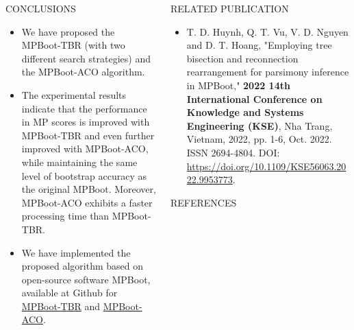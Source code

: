 \documentclass[%
  final,%
  english,%
]{beamer}
\begin{document}
\begin{frame}[t, fragile = singleslide]
\begin{columns}[t, onlytextwidth]
%
\begin{column}{0.49\textwidth}
%
\begin{block}{CONCLUSIONS}
\vspace{0.5cm}
\begin{itemize}
\item We have proposed the MPBoot-TBR (with two different search strategies) and the MPBoot-ACO algorithm.
\item The experimental results indicate that the performance in MP scores is improved with MPBoot-TBR and even further improved with MPBoot-ACO, while maintaining the same level of bootstrap accuracy as the original MPBoot. Moreover, MPBoot-ACO exhibits a faster processing time than MPBoot-TBR.
\item We have implemented the proposed algorithm based on open-source software MPBoot, available at Github for \href{https://github.com/HynDuf/mpboot/tree/Huynh_Tien_Dung}{MPBoot-TBR} and \href{https://github.com/HynDuf/mpboot/tree/ant-colony-optimization}{MPBoot-ACO}.
\end{itemize}
\end{block}
\end{column}
%
\begin{column}{0.49\textwidth}
%
\begin{block}{RELATED PUBLICATION}
\vspace{0.5cm}
\begin{itemize}
    \item \footnotesize{T. D. Huynh, Q. T. Vu, V. D. Nguyen and D. T. Hoang, "Employing tree bisection and reconnection rearrangement for parsimony inference in MPBoot," \textbf{2022 14th International Conference on Knowledge and Systems Engineering (KSE)}, Nha Trang, Vietnam, 2022, pp. 1-6, Oct. 2022. ISSN 2694-4804. DOI: \url{https://doi.org/10.1109/KSE56063.2022.9953773}.}
\end{itemize}
\end{block}
\begin{block}{REFERENCES}
\vspace{0.5cm}
\printbibliography[heading = none]
\end{block}
%
\end{column}
%
\end{columns}


\\
\\

\vspace*{\baselineskip}

\end{frame}

\end{document}
